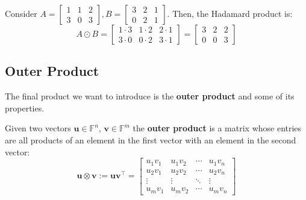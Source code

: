 \documentclass[../lecture-notes-148x210.tex]{subfiles}
\begin{document}
\begin{example}
    Consider $A = \begin{bmatrix}
        1 & 1 & 2 \\
        3 & 0 & 3
    \end{bmatrix}, B = \begin{bmatrix}
        3 & 2 & 1 \\ 0 & 2 & 1
    \end{bmatrix}$. Then, the Hadamard product is:
    \begin{equation*}
        A \odot B = \begin{bmatrix}
            1 \cdot 3 & 1 \cdot 2 & 2 \cdot 1 \\
            3 \cdot 0 & 0 \cdot 2 & 3 \cdot 1
        \end{bmatrix} = \begin{bmatrix}
            3 & 2 & 2 \\
            0 & 0 & 3
        \end{bmatrix}
    \end{equation*}
\end{example}

\subsection{Outer Product}

The final product we want to introduce is the \textbf{outer product} and some of its properties.

\begin{definition}
    Given two vectors $\mathbf{u} \in \mathbb{F}^n$, $\mathbf{v} \in \mathbb{F}^m$ the \textbf{outer product} is a
    matrix whose entries are all products of an element in the first vector with an element 
    in the second vector:
    \begin{equation*}
        \mathbf{u} \otimes \mathbf{v} := \mathbf{u}\mathbf{v}^{\top} = \begin{bmatrix}
            u_1 v_1 & u_1 v_2 & \cdots & u_1 v_n \\
            u_2 v_1 & u_2 v_2 & \cdots & u_2 v_n \\
            \vdots & \vdots & \ddots & \vdots \\
            u_m v_1 & u_m v_2 & \cdots & u_m v_n
        \end{bmatrix}
    \end{equation*}
\end{definition}
\end{document}
